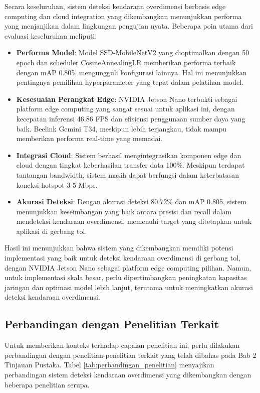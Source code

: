 Secara keseluruhan, sistem deteksi kendaraan overdimensi berbasis edge computing dan cloud integration yang dikembangkan menunjukkan performa yang menjanjikan dalam lingkungan pengujian nyata. Beberapa poin utama dari evaluasi keseluruhan meliputi:

\begin{itemize}
    \item \textbf{Performa Model}: Model SSD-MobileNetV2 yang dioptimalkan dengan 50 epoch dan scheduler CosineAnnealingLR memberikan performa terbaik dengan mAP 0.805, mengungguli konfigurasi lainnya. Hal ini menunjukkan pentingnya pemilihan hyperparameter yang tepat dalam pelatihan model.
    
    \item \textbf{Kesesuaian Perangkat Edge}: NVIDIA Jetson Nano terbukti sebagai platform edge computing yang sangat sesuai untuk aplikasi ini, dengan kecepatan inferensi 46.86 FPS dan efisiensi penggunaan sumber daya yang baik. Beelink Gemini T34, meskipun lebih terjangkau, tidak mampu memberikan performa real-time yang memadai.
    
    \item \textbf{Integrasi Cloud}: Sistem berhasil mengintegrasikan komponen edge dan cloud dengan tingkat keberhasilan transfer data 100\%. Meskipun terdapat tantangan bandwidth, sistem masih dapat berfungsi dalam keterbatasan koneksi hotspot 3-5 Mbps.
    
    \item \textbf{Akurasi Deteksi}: Dengan akurasi deteksi 80.72\% dan mAP 0.805, sistem menunjukkan keseimbangan yang baik antara presisi dan recall dalam mendeteksi kendaraan overdimensi, memenuhi target yang ditetapkan untuk aplikasi di gerbang tol.
\end{itemize}

Hasil ini menunjukkan bahwa sistem yang dikembangkan memiliki potensi implementasi yang baik untuk deteksi kendaraan overdimensi di gerbang tol, dengan NVIDIA Jetson Nano sebagai platform edge computing pilihan. Namun, untuk implementasi skala besar, perlu dipertimbangkan peningkatan kapasitas jaringan dan optimasi model lebih lanjut, terutama untuk meningkatkan akurasi deteksi kendaraan overdimensi.

\subsection{Perbandingan dengan Penelitian Terkait}

Untuk memberikan konteks terhadap capaian penelitian ini, perlu dilakukan perbandingan dengan penelitian-penelitian terkait yang telah dibahas pada Bab 2 Tinjauan Pustaka. Tabel \ref{tab:perbandingan_penelitian} menyajikan perbandingan sistem deteksi kendaraan overdimensi yang dikembangkan dengan beberapa penelitian serupa.

